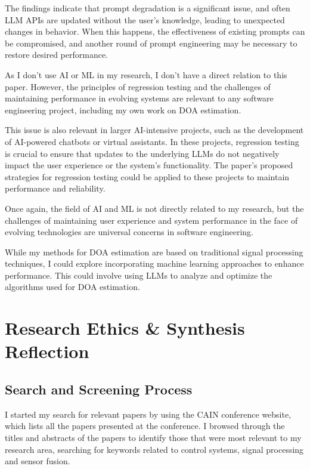 \documentclass[a4paper,11pt]{article}
\begin{document}
The findings indicate that prompt degradation is a significant issue, and often LLM APIs are updated without the user's knowledge, leading to unexpected changes in behavior. When this happens, the effectiveness of existing prompts can be compromised, and another round of prompt engineering may be necessary to restore desired performance.

As I don't use AI or ML in my research, I don't have a direct relation to this paper. However, the principles of regression testing and the challenges of maintaining performance in evolving systems are relevant to any software engineering project, including my own work on DOA estimation.

This issue is also relevant in larger AI-intensive projects, such as the development of AI-powered chatbots or virtual assistants. In these projects, regression testing is crucial to ensure that updates to the underlying LLMs do not negatively impact the user experience or the system's functionality. The paper's proposed strategies for regression testing could be applied to these projects to maintain performance and reliability.

Once again, the field of AI and ML is not directly related to my research, but the challenges of maintaining user experience and system performance in the face of evolving technologies are universal concerns in software engineering.

While my methods for DOA estimation are based on traditional signal processing techniques, I could explore incorporating machine learning approaches to enhance performance. This could involve using LLMs to analyze and optimize the algorithms used for DOA estimation.


\section{Research Ethics \& Synthesis Reflection}
\subsection{Search and Screening Process}
I started my search for relevant papers by using the CAIN conference website, which lists all the papers presented at the conference. I browsed through the titles and abstracts of the papers to identify those that were most relevant to my research area, searching for keywords related to control systems, signal processing and sensor fusion. 
\end{document}
